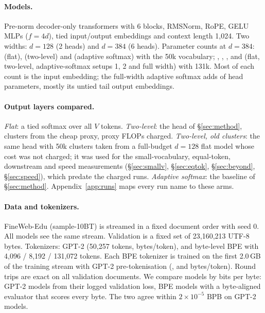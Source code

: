 \documentclass[11pt]{article}
\theoremstyle{remark}
\begin{document}
\paragraph{Models.} Pre-norm decoder-only transformers with 6 blocks, RMSNorm, RoPE, GELU MLPs ($f = 4d$), tied input/output
embeddings and context length 1,024. Two widths: $d=128$ (2 heads) and $d=384$ (6 heads). Parameter counts at $d=384$:
\ParamsB{} (flat), \ParamsHs{} (two-level) and \ParamsAsFifty{} (adaptive softmax) with the 50k vocabulary; \ParamsFbig{},
\ParamsHbig{}, \ParamsAsBigOne{}, \ParamsAsBigTwo{} and \ParamsAsBigW{} (flat, two-level, adaptive-softmax setups 1, 2 and full
width) with 131k. Most of each count is the input embedding; the full-width adaptive softmax adds \HeadParamsAsBigW{} of head
parameters, mostly its untied tail output embeddings.

\paragraph{Output layers compared.} \emph{Flat}: a tied softmax over all $V$ tokens. \emph{Two-level}: the head of
\S\ref{sec:method}, clusters from the cheap proxy, proxy FLOPs charged. \emph{Two-level, old clusters}: the same head with 50k
clusters taken from a full-budget $d=128$ flat model whose cost was not charged; it was used for the small-vocabulary,
equal-token, downstream and speed measurements (\S\ref{sec:smallv}, \S\ref{sec:eqtok}, \S\ref{sec:beyond},
\S\ref{sec:speed}), which predate the charged runs. \emph{Adaptive softmax}: the baseline of
\S\ref{sec:method}. Appendix~\ref{app:runs} maps every run name to these arms.

\paragraph{Data and tokenizers.} FineWeb-Edu (sample-10BT) is streamed in a fixed document order with seed 0. All models see the
same stream. Validation is a fixed set of 23,160,213 UTF-8 bytes. Tokenizers: GPT-2 (50,257 tokens, \BptGpt{} bytes/token), and
byte-level BPE with 4,096 / 8,192 / 131,072 tokens. Each BPE tokenizer is trained on the first 2.0\,GB of the training stream with
GPT-2 pre-tokenisation (\BptFfour{}, \BptFeight{} and \BptBig{} bytes/token). Round trips are exact on all validation documents.
We compare models by bits per byte: GPT-2 models from their logged validation loss, BPE models with a byte-aligned evaluator that
scores every byte. The two agree within $2\times10^{-5}$ BPB on GPT-2 models.
\end{document}
